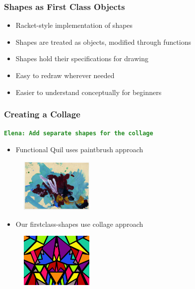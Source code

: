 \documentclass{beamer}
\newcommand{\comment}[1]{{\bf \tt  {#1}}}
\newcommand{\emcomment}[1]{\textcolor{ForestGreen}{\comment{Elena: {#1}}}}
\begin{document}
\begin{frame}
\frametitle{Shapes as First Class Objects}
	\begin{itemize}
		\item Racket-style implementation of shapes
		\item Shapes are treated as objects, modified through functions
		\item Shapes hold their specifications for drawing
		\item Easy to redraw wherever needed
		\item Easier to understand conceptually for beginners
	\end{itemize}
\end{frame}

\begin{frame}
\frametitle{Creating a Collage}
\emcomment{Add separate shapes for the collage}
	\begin{itemize}
		\item Functional Quil uses paintbrush approach
	\end{itemize}
	\begin{figure}
	\includegraphics[width=3.5cm]{PresentationImages/painting.jpg}
	\end{figure}
	\begin{itemize}
		\item Our firstclass-shapes use collage approach
	\end{itemize}
	\begin{figure}
	\includegraphics[width=3.5cm]{PresentationImages/collage.jpg}
	\end{figure}
\end{frame}
\end{document}
